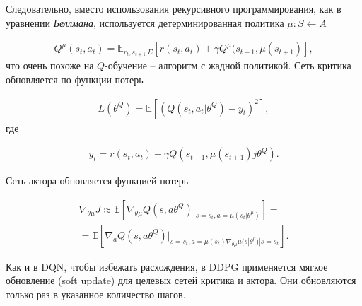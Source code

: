 Следовательно, вместо использования рекурсивного программирования, как в уравнении {\itshape Беллмана}, используется детерминированная политика ${\mu : S \leftarrow A}$ \cite{lillicrap2015continuous}

\begin{equation}
    \label{eq:ch1-ddpg-1}
    \begin{multlined}
        Q^\mu (s_t, a_t) = \mathbb{E}_{r_t, s_{t+1}~E}[r(s_t, a_t) + \gamma Q^\mu(s_{t+1}, \mu(s_{t+1})],
    \end{multlined}
\end{equation}
что очень похоже на $Q$-обучение – алгоритм с жадной политикой. Сеть критика обновляется по функции потерь

\begin{equation}
    \label{eq:ch1-ddpg-1}
    \begin{multlined}
        L(\theta^Q) = \mathbb{E}[(Q(s_t, a_t|\theta^Q) - y_t)^2],
    \end{multlined}
\end{equation}
где

\begin{equation}
    \label{eq:ch1-ddpg-3}
    \begin{multlined}
        y_t = r(s_t, a_t) + \gamma Q(s_{t+1}, \mu(s_{t+1})j\theta^Q).
    \end{multlined}
\end{equation}

Сеть актора обновляется функцией потерь

\begin{equation}
    \label{eq:ch1-ddpg-4}
    \begin{multlined}
        \nabla_{\theta \mu} J \approx \mathbb{E}[\nabla_{\theta \mu} Q(s, a \theta^Q)|_{s=s_t,a=\mu(s_t|\theta^\mu)}] = \\
        = \mathbb{E}[\nabla_a Q(s, a \theta^Q)|_{s=s_t,a=\mu(s_t) \nabla_{\theta \mu} \mu (s|\theta^\mu)|s=s_t}].
    \end{multlined}
\end{equation}

Как и в DQN, чтобы избежать расхождения, в DDPG применяется мягкое обновление (soft update) для целевых сетей критика и актора. Они обновляются только раз в указанное количество шагов.
